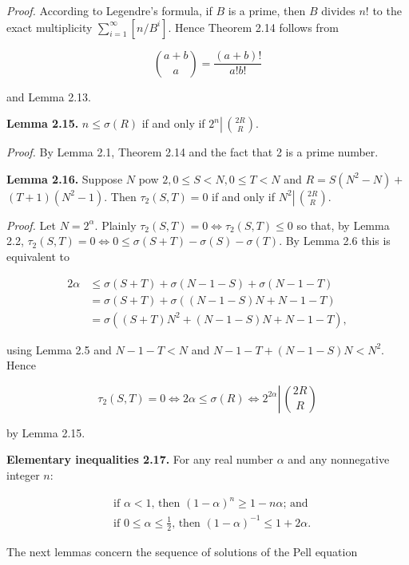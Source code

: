 \documentclass[11pt,a4paper]{article}
\begin{document}
\noindent\emph{Proof.} According to Legendre's formula, if $B$ is a prime, then $B$ divides $n!$ to the exact multiplicity $\sum_{i=1}^{\infty}\left[n / B^{i}\right]$. Hence Theorem 2.14 follows from

\[
\binom{a+b}{a}=\frac{(a+b)!}{a!b!}
\]

and Lemma 2.13.

\noindent\textbf{Lemma 2.15.} $n \leq \sigma(R)$ if and only if $2^{n} \left\lvert\,\allowbreak \binom{ 2 R}{R}\right.$.

\noindent\emph{Proof.} By Lemma 2.1, Theorem 2.14 and the fact that 2 is a prime number.

\noindent\textbf{Lemma 2.16.} Suppose $N$ pow $2,\allowbreak 0 \leq S<N,\allowbreak  0 \leq T<N$ and $R=S\left(N^{2}-N\right)+$ $(T+1)\left(N^{2}-1\right)$. Then $\tau_{2}(S,\allowbreak  T)=0$ if and only if $N^{2} \left\lvert\,\allowbreak \binom{2R}{R}\right.$.

\noindent\emph{Proof.} Let $N=2^{\alpha}$. Plainly $\tau_{2}(S,\allowbreak  T)=0 \Leftrightarrow \tau_{2}(S,\allowbreak  T) \leq 0$ so that, by Lemma 2.2, $\tau_{2}(S,\allowbreak  T)=0 \Leftrightarrow 0 \leq \sigma(S+T)-\sigma(S)-\sigma(T)$. By Lemma 2.6 this is equivalent to

\[
\begin{aligned}
2 \alpha & \leq \sigma(S+T)+\sigma(N-1-S)+\sigma(N-1-T) \\
& =\sigma(S+T)+\sigma((N-1-S) N+N-1-T) \\
& =\sigma\left((S+T) N^{2}+(N-1-S) N+N-1-T\right),
\end{aligned}
\]

using Lemma 2.5 and $N-1-T<N$ and $N-1-T+(N-1-S) N<N^{2}$. Hence

\[
\tau_{2}(S, T)=0 \Leftrightarrow 2 \alpha \leq \sigma(R) \Leftrightarrow 2^{2 \alpha} \left\lvert\,\binom{ 2 R}{R}\right.
\]

by Lemma 2.15.

\noindent\textbf{Elementary inequalities 2.17.} For any real number $\alpha$ and any nonnegative integer $n$:

\[
\begin{aligned}
& \text { if } \alpha<1 \text {, then }(1-\alpha)^{n} \geq 1-n\alpha \text {; and } \\
& \text { if } 0 \leq \alpha \leq \frac{1}{2} \text {, then }(1-\alpha)^{-1} \leq 1+2 \alpha \text {. }
\end{aligned}
\]

The next lemmas concern the sequence of solutions of the Pell equation
\end{document}

